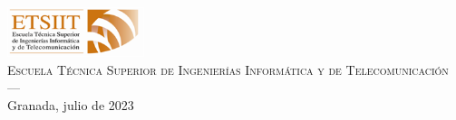 \begin{titlepage}
\begin{minipage}{\textwidth}
\includegraphics[width=0.3\textwidth]{imagenes/logos/logo_etsiit.png}\\[0.1cm]

\textsc{Escuela Técnica Superior de Ingenierías Informática y de Telecomunicación}\\
\textsc{---}\\Granada, julio de 2023

\end{minipage}

\end{titlepage}